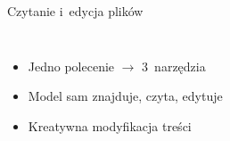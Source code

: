 \documentclass[aspectratio=169]{beamer}
\begin{document}
\begin{frame}{Czytanie i~edycja plik\'ow}
\begin{columns}[T]
        \vspace{0.15cm}
        \begin{itemize}\setlength{\itemsep}{0pt}\footnotesize
            \item Jedno polecenie $\rightarrow$ 3~narz\k{e}dzia
            \item Model sam znajduje, czyta, edytuje
            \item Kreatywna modyfikacja tre\'sci
        \end{itemize}
    \end{columns}
\end{frame}

\end{document}
